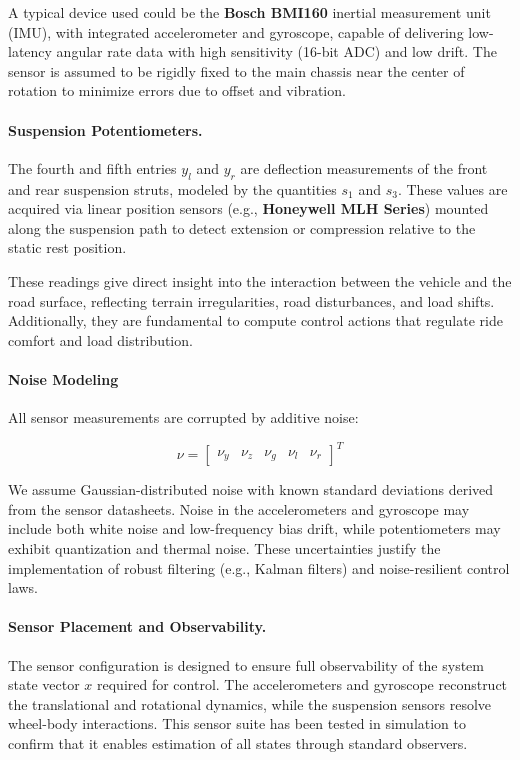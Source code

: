 \documentclass[]{report}
\begin{document}
	A typical device used could be the \textbf{Bosch BMI160} inertial measurement unit (IMU), with integrated accelerometer and gyroscope, capable of delivering low-latency angular rate data with high sensitivity (16-bit ADC) and low drift. The sensor is assumed to be rigidly fixed to the main chassis near the center of rotation to minimize errors due to offset and vibration.
	
	\paragraph{Suspension Potentiometers.}
	The fourth and fifth entries $y_l$ and $y_r$ are deflection measurements of the front and rear suspension struts, modeled by the quantities $s_1$ and $s_3$. These values are acquired via linear position sensors (e.g., \textbf{Honeywell MLH Series}) mounted along the suspension path to detect extension or compression relative to the static rest position.
	
	These readings give direct insight into the interaction between the vehicle and the road surface, reflecting terrain irregularities, road disturbances, and load shifts. Additionally, they are fundamental to compute control actions that regulate ride comfort and load distribution.
	
	\paragraph{Noise Modeling}
	All sensor measurements are corrupted by additive noise:
	
	\[
	\nu = \begin{bmatrix}
		\nu_y & \nu_z & \nu_g & \nu_l & \nu_r
	\end{bmatrix}^T
	\]
	
	We assume Gaussian-distributed noise with known standard deviations derived from the sensor datasheets. Noise in the accelerometers and gyroscope may include both white noise and low-frequency bias drift, while potentiometers may exhibit quantization and thermal noise. These uncertainties justify the implementation of robust filtering (e.g., Kalman filters) and noise-resilient control laws.
	
	\paragraph{Sensor Placement and Observability.}
	The sensor configuration is designed to ensure full observability of the system state vector $x$ required for control. The accelerometers and gyroscope reconstruct the translational and rotational dynamics, while the suspension sensors resolve wheel-body interactions. This sensor suite has been tested in simulation to confirm that it enables estimation of all states through standard observers.
	
\end{document}
